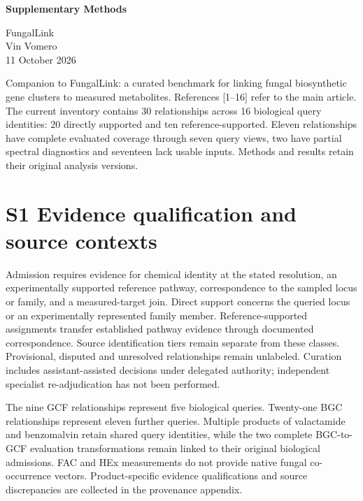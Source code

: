 \documentclass[
  10pt,
  a4paper,
]{article}
\author{}
\date{}
\begin{document}
\begin{center}{\LARGE\bfseries\color{ink}Supplementary Methods\par}\vspace{6pt}
{\large FungalLink}\\[4pt]
Vin Vomero\\[4pt]
11 October 2026\end{center}
\vspace{8pt}

Companion to FungalLink: a curated benchmark for linking fungal biosynthetic gene clusters to measured metabolites. References {[}1--16{]} refer to the main article. The current inventory contains 30 relationships across 16 biological query identities: 20 directly supported and ten reference-supported. Eleven relationships have complete evaluated coverage through seven query views, two have partial spectral diagnostics and seventeen lack usable inputs. Methods and results retain their original analysis versions.

\section{S1 Evidence qualification and source contexts}\label{s1-evidence-qualification-and-source-contexts}

Admission requires evidence for chemical identity at the stated resolution, an experimentally supported reference pathway, correspondence to the sampled locus or family, and a measured-target join. Direct support concerns the queried locus or an experimentally represented family member. Reference-supported assignments transfer established pathway evidence through documented correspondence. Source identification tiers remain separate from these classes. Provisional, disputed and unresolved relationships remain unlabeled. Curation includes assistant-assisted decisions under delegated authority; independent specialist re-adjudication has not been performed.

The nine GCF relationships represent five biological queries. Twenty-one BGC relationships represent eleven further queries. Multiple products of valactamide and benzomalvin retain shared query identities, while the two complete BGC-to-GCF evaluation transformations remain linked to their original biological admissions. FAC and HEx measurements do not provide native fungal co-occurrence vectors. Product-specific evidence qualifications and source discrepancies are collected in the provenance appendix.
\end{document}
